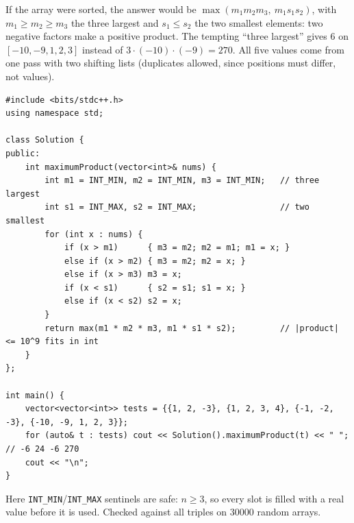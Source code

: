 \begin{solutionbox}
If the array were sorted, the answer would be $\max(m_1 m_2 m_3,\ m_1 s_1 s_2)$, with $m_1 \ge m_2 \ge m_3$ the three largest and $s_1 \le s_2$ the two smallest elements: two negative factors make a positive product. The tempting ``three largest'' gives $6$ on $[-10, -9, 1, 2, 3]$ instead of $3\cdot(-10)\cdot(-9) = 270$. All five values come from one pass with two shifting lists (duplicates allowed, since positions must differ, not values).
\begin{lstlisting}[style=cpp]
#include <bits/stdc++.h>
using namespace std;

class Solution {
public:
    int maximumProduct(vector<int>& nums) {
        int m1 = INT_MIN, m2 = INT_MIN, m3 = INT_MIN;   // three largest
        int s1 = INT_MAX, s2 = INT_MAX;                 // two smallest
        for (int x : nums) {
            if (x > m1)      { m3 = m2; m2 = m1; m1 = x; }
            else if (x > m2) { m3 = m2; m2 = x; }
            else if (x > m3) m3 = x;
            if (x < s1)      { s2 = s1; s1 = x; }
            else if (x < s2) s2 = x;
        }
        return max(m1 * m2 * m3, m1 * s1 * s2);         // |product| <= 10^9 fits in int
    }
};

int main() {
    vector<vector<int>> tests = {{1, 2, -3}, {1, 2, 3, 4}, {-1, -2, -3}, {-10, -9, 1, 2, 3}};
    for (auto& t : tests) cout << Solution().maximumProduct(t) << " ";   // -6 24 -6 270
    cout << "\n";
}
\end{lstlisting}
Here \texttt{INT\_MIN}/\texttt{INT\_MAX} sentinels are safe: $n \ge 3$, so every slot is filled with a real value before it is used. Checked against all triples on 30000 random arrays.
\end{solutionbox}

